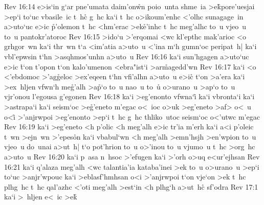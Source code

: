 \vs Rev 16:14
e>is`in
g`ar
pne'umata
daim'on\r{w}n
poio~unta
shme~ia
>e\r{k}pore'uesjai
>ep`i
to`uc
vbasile~ic
t~hc\r{}
g~hc
ka`i
t~hc
o>ikoum'enhc
<'olhc
sunagage~in
a>uto`uc
e>ic
\r{p}'olemon
t~hc
<hm'erac
>ek\r{e}'inhc
t~hc
meg'alhc
to~u
vjeo~u
to~u
pantokr'atoroc\bibvsend
\vs Rev 16:15
>ido`u
>'erqomai
<wc
kl'epthc
mak'arioc
<o
grhgor~wn
ka`i
thr~wn
t`a
<im'atia
a>uto~u
<'ina
m`h
gumn`oc
peripat~h|
ka`i
vbl'epwsin
t`hn
>asqhmos'unhn
a>uto~u\bibvsend
\vs Rev 16:16
ka`i
sun'hgagen
a>uto`uc
e>ic
\r{t}`on
t'opon
t`on
kalo'umenon
<ebra"ist`i
>ar\r{m}agedd'wn\bibvsend
{}
\vs Rev 16:17
ka`i
<o
<'ebdomoc
>'ag\r{g}eloc
>ex'eqeen
t`hn
vfi'alhn
a>uto~u
e>i\r{c}
t`on
>a'era
ka`i
>ex~hljen
vfwn`h
me\r{g}'alh
>a\r{p}`o
to~u
nao~u
to~u\r{}
o>urano~u
>ap`o
to~u
vjr'onou
l'egousa
g'egonen\bibvsend
\vs Rev 16:18
ka`i
>eg'enonto
vfwna`i\r{}
ka`i
vbronta`i
ka`i
>astrapa`i
ka`i
seism`oc
>e\r{g}'eneto
m'egac
o<~ioc
o>uk
>eg'eneto
>af>
o<~u
o<i\r{}
>'anjrwpoi
>eg'enonto
>ep`i
t~hc
g~hc
thliko~utoc
seism`oc
o<'utwc
m'egac\bibvsend
\vs Rev 16:19
ka`i
>eg'eneto
<h
p'olic
<h
meg'alh
e>ic
tr'ia
m'erh
ka`i
a<i
p'oleic
t~wn
>ejn~wn
>'epes\r{o}n
ka`i
vbabul`wn
<h
meg'alh
>emn'hsjh
>en'wpion
to~u
vjeo~u
do~unai
a>ut~h|
t`o
pot'hrion
to~u
o>'inou
to~u
vjumo~u
t~hc
>org~hc
a>uto~u\bibvsend
\vs Rev 16:20
ka`i
p~asa
n~hsoc
>'efugen
ka`i
>'orh
o>uq
e<ur'ejhsan\bibvsend
\vs Rev 16:21
ka`i
q'alaza
meg'alh
<wc
talantia'ia
kataba'inei
>ek
to~u
o>urano~u
>ep`i
to`uc
>anjr'wpouc
ka`i
>eblasf'hmhsan
o<i
>'anjrwpoi
t`on
vje`on
>ek
t~hc
plhg~hc
t~hc
qal'azhc
<'oti
meg'alh
>est`in
<h
plhg`h
a>ut~h\r{c}
sf'odra\bibvsend
\vs Rev 17:1
ka`i
>~hljen
e<~ic
>e\r{k}
